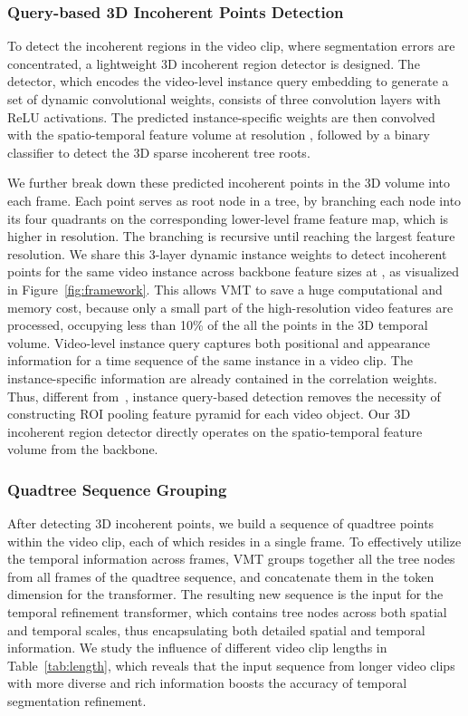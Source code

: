 \documentclass[runningheads]{llncs}
\begin{document}
\subsubsection{Query-based 3D Incoherent Points Detection} To detect the incoherent regions in the video clip, where segmentation errors are concentrated, a lightweight 3D incoherent region detector is designed. The detector, which encodes the video-level instance query embedding to generate a set of dynamic convolutional weights, consists of  three  convolution layers with ReLU activations. The predicted instance-specific weights are then convolved with the spatio-temporal feature volume at resolution , followed by a binary classifier to detect the 3D sparse incoherent tree roots. 


We further break down these predicted incoherent points in the 3D volume into each frame. Each point serves as root node in a tree, by branching each node into its four quadrants on the corresponding lower-level frame feature map, which is  higher in resolution. The branching is recursive until reaching the largest feature resolution.
We share this 3-layer dynamic instance weights to detect incoherent points for the same video instance across backbone feature sizes at , as visualized in Figure~\ref{fig:framework}.
This allows VMT to save a huge computational and memory cost, because only a small part of the high-resolution video features are processed, occupying less than 10\% of the all the points in the 3D temporal volume. 
Video-level instance query captures both positional and appearance information for a time sequence of the same instance in a video clip.
The instance-specific information are already contained in the correlation weights.
Thus, different from~\cite{transfiner}, instance query-based detection removes the necessity of constructing ROI pooling feature pyramid for each video object.
Our 3D incoherent region detector directly operates on the spatio-temporal feature volume from the backbone.

\label{sec:incoherent}

\subsubsection{Quadtree Sequence Grouping}
After detecting 3D incoherent points, we build a sequence of quadtree points within the video clip, each of which resides in a single frame.
To effectively utilize the temporal information across frames, VMT groups together all the tree nodes from all frames of the quadtree sequence, and concatenate them in the token dimension for the transformer. 
The resulting new sequence is the input for the temporal refinement transformer, which contains tree nodes across both spatial and temporal scales, thus encapsulating both detailed spatial and temporal information. We study the influence of different video clip lengths in Table~\ref{tab:length}, which reveals that the input sequence from longer video clips with more diverse and rich information  boosts the accuracy of temporal segmentation refinement.
\end{document}
